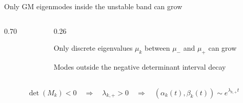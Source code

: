 \begin{frame}{Only GM eigenmodes inside the unstable band can grow}
\begin{columns}[c,onlytextwidth]
\begin{column}{0.70\textwidth}

    \end{column}

    \begin{column}{0.26\textwidth}

        {Only discrete eigenvalues $\mu_k$ between $\mu_-$ and $\mu_+$ can grow}

      \vspace{0.02cm}

        {Modes outside the negative determinant interval decay}

    \end{column}

  \end{columns}

  \vspace{-0.18cm}

  {\color{HydraWhite}\fontsize{8.6}{10.9}\selectfont
  \begin{align*}
    \det(M_k)<0
    \quad\Rightarrow\quad
    \lambda_{k,+}>0
    \quad\Rightarrow\quad
    (\alpha_k(t),\beta_k(t))
    \sim
    e^{\lambda_{k,+}t}
  \end{align*}
  }

\end{frame}




